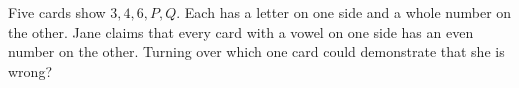 Five cards show $3,4,6,P,Q$. Each has a letter on one side and a whole number on the other. Jane claims that every card with a vowel on one side has an even number on the other. Turning over which one card could demonstrate that she is wrong?
